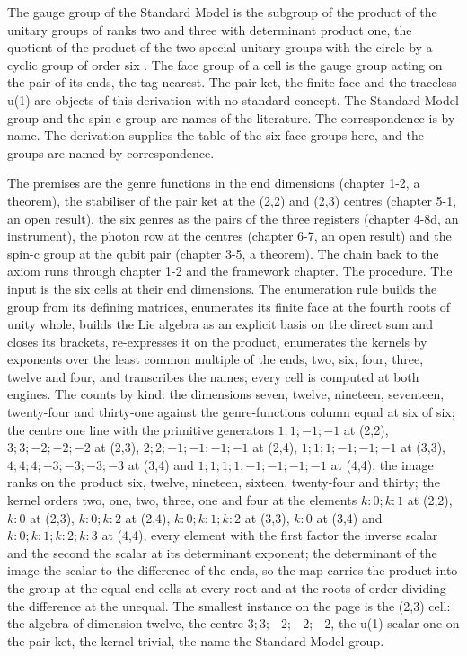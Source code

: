 \begin{chbridge}
The gauge group of the Standard Model is the subgroup of the product of the unitary groups of ranks two and three with determinant product one, the quotient of the product of the two special unitary groups with the circle by a cyclic group of order six \cite{Baez2010,Weinberg1967}.
The face group of a cell is the gauge group acting on the pair of its ends, the tag nearest. The pair ket, the finite face and the traceless u(1) are objects of this derivation with no standard concept. The Standard Model group and the spin-c group are names of the literature. The correspondence is by name. The derivation supplies the table of the six face groups here, and the groups are named by correspondence.
\end{chbridge}
\begin{chproof}[instrument]
The premises are the genre functions in the end dimensions (chapter 1-2, a theorem), the stabiliser of the pair ket at the (2,2) and (2,3) centres (chapter 5-1, an open result), the six genres as the pairs of the three registers (chapter 4-8d, an instrument), the photon row at the centres (chapter 6-7, an open result) and the spin-c group at the qubit pair (chapter 3-5, a theorem). The chain back to the axiom runs through chapter 1-2 and the framework chapter. The procedure. The input is the six cells at their end dimensions. The enumeration rule builds the group from its defining matrices, enumerates its finite face at the fourth roots of unity whole, builds the Lie algebra as an explicit basis on the direct sum and closes its brackets, re-expresses it on the product, enumerates the kernels by exponents over the least common multiple of the ends, two, six, four, three, twelve and four, and transcribes the names; every cell is computed at both engines. The counts by kind: the dimensions seven, twelve, nineteen, seventeen, twenty-four and thirty-one against the genre-functions column equal at six of six; the centre one line with the primitive generators $1;1;-1;-1$ at (2,2), $3;3;-2;-2;-2$ at (2,3), $2;2;-1;-1;-1;-1$ at (2,4), $1;1;1;-1;-1;-1$ at (3,3), $4;4;4;-3;-3;-3;-3$ at (3,4) and $1;1;1;1;-1;-1;-1;-1$ at (4,4); the image ranks on the product six, twelve, nineteen, sixteen, twenty-four and thirty; the kernel orders two, one, two, three, one and four at the elements $k{:}0;k{:}1$ at (2,2), $k{:}0$ at (2,3), $k{:}0;k{:}2$ at (2,4), $k{:}0;k{:}1;k{:}2$ at (3,3), $k{:}0$ at (3,4) and $k{:}0;k{:}1;k{:}2;k{:}3$ at (4,4), every element with the first factor the inverse scalar and the second the scalar at its determinant exponent; the determinant of the image the scalar to the difference of the ends, so the map carries the product into the group at the equal-end cells at every root and at the roots of order dividing the difference at the unequal. The smallest instance on the page is the (2,3) cell: the algebra of dimension twelve, the centre $3;3;-2;-2;-2$, the u(1) scalar one on the pair ket, the kernel trivial, the name the Standard Model group.


\end{chproof}
